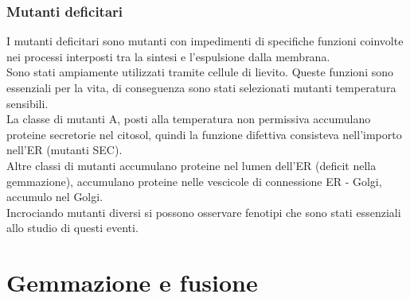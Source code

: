         \subsubsection{Mutanti deficitari}
            I mutanti deficitari sono mutanti con impedimenti di specifiche funzioni coinvolte nei processi interposti tra la sintesi e l'espulsione dalla membrana. \\
            Sono stati ampiamente utilizzati tramite cellule di lievito. Queste funzioni sono essenziali per la vita, di conseguenza sono stati selezionati mutanti temperatura sensibili.\\
            La classe di mutanti A, posti alla temperatura non permissiva accumulano proteine secretorie nel citosol, quindi la funzione difettiva consisteva nell'importo nell'ER (mutanti SEC).\\
            Altre classi di mutanti accumulano proteine nel lumen dell'ER (deficit nella gemmazione), accumulano proteine nelle vescicole di connessione ER - Golgi, accumulo nel Golgi.\\
            Incrociando mutanti diversi si possono osservare fenotipi che sono stati essenziali allo studio di questi eventi.

\section{Gemmazione e fusione}
